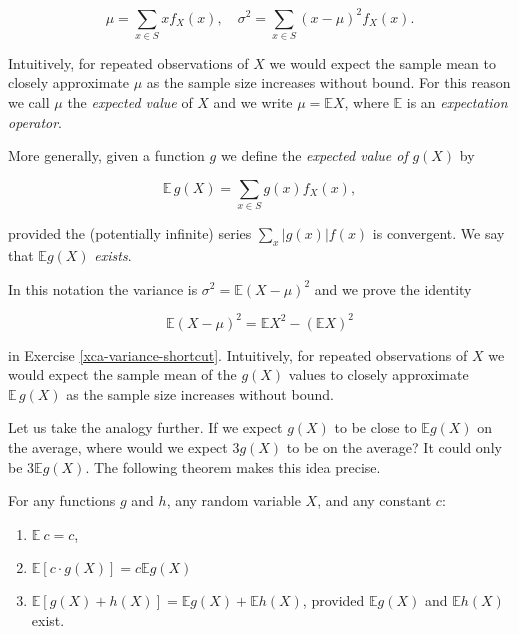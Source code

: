 \documentclass[]{book}
\providecommand{\tightlist}{%
  \setlength{\itemsep}{0pt}\setlength{\parskip}{0pt}}
\numberwithin{equation}{chapter}
\numberwithin{figure}{chapter}
\theoremstyle{plain}
\theoremstyle{definition}
\theoremstyle{remark}
\theoremstyle{definition}
\theoremstyle{definition}
\theoremstyle{remark}
\let\BeginKnitrBlock\begin \let\EndKnitrBlock\end
\begin{document}
\begin{equation}
\mu = \sum_{x \in S}x f_{X}(x),\quad \sigma^{2} = \sum_{x \in S}(x - \mu)^{2} f_{X}(x).
\end{equation}

Intuitively, for repeated observations of \(X\) we would expect the
sample mean to closely approximate \(\mu\) as the sample size increases
without bound. For this reason we call \(\mu\) the \emph{expected value}
of \(X\) and we write \(\mu=\mathbb{E} X\), where \(\mathbb{E}\) is an
\emph{expectation operator}.

\bigskip

\BeginKnitrBlock{definition}
\protect\hypertarget{def:unnamed-chunk-213}{}{\label{def:unnamed-chunk-213}}More
generally, given a function \(g\) we define the \emph{expected value of}
\(g(X)\) by

\begin{equation}
\mathbb{E}\, g(X)=\sum_{x\in S}g(x)f_{X}(x),
\end{equation}

provided the (potentially infinite) series
\(\sum_{x} \vert g(x) \vert f(x)\) is convergent. We say that
\(\mathbb{E} g(X)\) \emph{exists}.
\EndKnitrBlock{definition}

In this notation the variance is
\(\sigma^{2} = \mathbb{E}(X - \mu)^{2}\) and we prove the identity

\begin{equation}
\mathbb{E}(X - \mu)^{2} = \mathbb{E} X^{2} - (\mathbb{E} X)^{2}
\end{equation}

in Exercise \ref{xca-variance-shortcut}. Intuitively, for repeated
observations of \(X\) we would expect the sample mean of the \(g(X)\)
values to closely approximate \(\mathbb{E}\, g(X)\) as the sample size
increases without bound.

Let us take the analogy further. If we expect \(g(X)\) to be close to
\(\mathbb{E} g(X)\) on the average, where would we expect \(3g(X)\) to
be on the average? It could only be \(3\mathbb{E} g(X)\). The following
theorem makes this idea precise.

\bigskip

\BeginKnitrBlock{proposition}
\protect\hypertarget{prp:expectation-properties}{}{\label{prp:expectation-properties}}For
any functions \(g\) and \(h\), any random variable \(X\), and any
constant \(c\):

\begin{enumerate}
\def\labelenumi{\arabic{enumi}.}
\tightlist
\item
  \(\mathbb{E}\: c=c\),
\item
  \(\mathbb{E}[c\cdot g(X)]=c\mathbb{E} g(X)\)
\item
  \(\mathbb{E}[g(X)+h(X)]=\mathbb{E} g(X)+\mathbb{E} h(X)\), provided
  \(\mathbb{E} g(X)\) and \(\mathbb{E} h(X)\) exist.
\end{enumerate}
\EndKnitrBlock{proposition}
\end{document}

